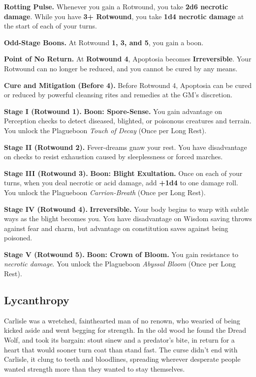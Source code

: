 \textbf{Rotting Pulse.} Whenever you gain a Rotwound, you take \textbf{2d6 necrotic damage}. While you have \textbf{3+ Rotwound}, you take \textbf{1d4 necrotic damage} at the start of each of your turns.

\textbf{Odd-Stage Boons.} At Rotwound \textbf{1, 3, and 5}, you gain a boon.

\textbf{Point of No Return.} At \textbf{Rotwound 4}, Apoptosia becomes \textbf{Irreversible}. Your Rotwound can no longer be reduced, and you cannot be cured by any means.

\textbf{Cure and Mitigation (Before 4).} Before Rotwound 4, Apoptosia can be cured or reduced by powerful cleansing rites and remedies at the GM's discretion.

\medskip

\textbf{Stage I (Rotwound 1).} \textbf{Boon: Spore-Sense.} You gain advantage on Perception checks to detect diseased, blighted, or poisonous creatures and terrain.
You unlock the Plagueboon \emph{Touch of Decay} (Once per Long Rest).

\textbf{Stage II (Rotwound 2).} Fever-dreams gnaw your rest. You have disadvantage on checks to resist exhaustion caused by sleeplessness or forced marches.

\textbf{Stage III (Rotwound 3).} \textbf{Boon: Blight Exultation.} Once on each of your turns, when you deal necrotic or acid damage, add \textbf{+1d4} to one damage roll.
You unlock the Plagueboon \emph{Carrion-Breath} (Once per Long Rest).

\textbf{Stage IV (Rotwound 4).} \textbf{Irreversible.} Your body begins to warp with subtle ways as the blight becomes you. You have disadvantage on Wisdom saving throws against fear and charm, but advantage on constitution saves against being poisoned.

\textbf{Stage V (Rotwound 5).} \textbf{Boon: Crown of Bloom.} You gain resistance to \textit{necrotic damage}.
You unlock the Plagueboon \emph{Abyssal Bloom} (Once per Long Rest).

\subsection{Lycanthropy}
\label{main:lycanthropy}

Carlisle was a wretched, fainthearted man of no renown, who wearied of being kicked aside and went begging for strength. In the old wood he found the Dread Wolf, and took its bargain: stout sinew and a predator’s bite, in return for a heart that would sooner turn coat than stand fast. The curse didn’t end with Carlisle, it clung to teeth and bloodlines, spreading wherever desperate people wanted strength more than they wanted to stay themselves.

